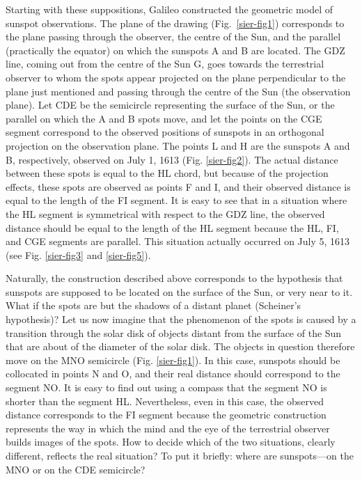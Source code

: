 \begin{artengenv}
Starting with these suppositions, Galileo constructed the geometric model of sunspot observations. The plane of the
drawing (Fig.~\ref{sier-fig1}) corresponds to the plane passing through the observer, the centre of the Sun, and the parallel
(practically the equator) on which the sunspots A and B are located. The GDZ line, coming out from the centre of the
Sun G, goes towards the terrestrial observer to whom the spots appear projected on the plane perpendicular to the plane
just mentioned and passing through the centre of the Sun (the observation plane). Let CDE be the semicircle
representing the surface of the Sun, or the parallel on which the A and B spots move, and let the points on the CGE
segment correspond to the observed positions of sunspots in an orthogonal projection on the observation plane. The
points L and H are the sunspots A and B, respectively, observed on July 1, 1613 (Fig. \ref{sier-fig2}). The actual distance between
these spots is equal to the HL chord, but because of the projection effects, these spots are observed as points F and
I, and their observed distance is equal to the length of the FI segment. It is easy to see that in a situation where
the HL segment is symmetrical with respect to the GDZ line, the observed distance should be equal to the length of the
HL segment because the HL, FI, and CGE segments are parallel. This situation actually occurred on July 5, 1613 (see Fig.
\ref{sier-fig3} and \ref{sier-fig5}).

Naturally, the construction described above corresponds to the hypothesis that sunspots are supposed to be located on
the surface of the Sun, or very near to it. What if the spots are but the shadows of a distant planet (Scheiner’s
hypothesis)? Let us now imagine that the phenomenon of the spots is caused by a transition through the solar disk of
objects distant from the surface of the Sun that are about  of the diameter of the solar disk. The objects in
question therefore move on the MNO semicircle (Fig. \ref{sier-fig1}). In this case, sunspots should be collocated in points N and O,
and their real distance should correspond to the segment NO. It is easy to find out using a compass that the segment NO
is shorter than the segment HL. Nevertheless, even in this case, the observed distance corresponds to the FI segment
because the geometric construction represents the way in which the mind and the eye of the terrestrial observer builds
images of the spots. How to decide which of the two situations, clearly different, reflects the real situation? To put
it briefly: where are sunspots---on the MNO or on the CDE semicircle?


\end{artengenv}
